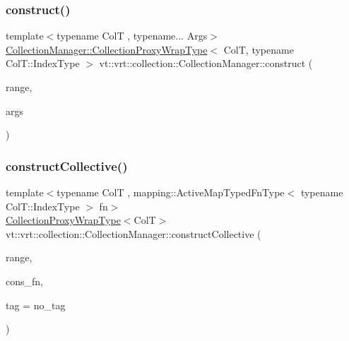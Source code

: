 \mbox{\label{structvt_1_1vrt_1_1collection_1_1_collection_manager_a9049432725068d7ec7f664f7a8759a69}} 
\subsubsection{\texorpdfstring{construct()}{construct()}\hspace{0.1cm}{\footnotesize\ttfamily [2/2]}}
{\footnotesize\ttfamily template$<$typename ColT , typename... Args$>$ \\
\hyperlink{structvt_1_1vrt_1_1collection_1_1_collection_manager_a56458ed7f9bb22b631b9b3a745f42f94}{Collection\+Manager\+::\+Collection\+Proxy\+Wrap\+Type}$<$ ColT, typename Col\+T\+::\+Index\+Type $>$ vt\+::vrt\+::collection\+::\+Collection\+Manager\+::construct (\begin{DoxyParamCaption}\item[{typename Col\+T\+::\+Index\+Type}]{range,  }\item[{Args \&\&...}]{args }\end{DoxyParamCaption})}

\mbox{\label{structvt_1_1vrt_1_1collection_1_1_collection_manager_a619d6e576f0d108e442b16ca4f68f1f3}} 
\subsubsection{\texorpdfstring{construct\+Collective()}{constructCollective()}\hspace{0.1cm}{\footnotesize\ttfamily [1/3]}}
{\footnotesize\ttfamily template$<$typename ColT , mapping\+::\+Active\+Map\+Typed\+Fn\+Type$<$ typename Col\+T\+::\+Index\+Type $>$ fn$>$ \\
\hyperlink{structvt_1_1vrt_1_1collection_1_1_collection_manager_a56458ed7f9bb22b631b9b3a745f42f94}{Collection\+Proxy\+Wrap\+Type}$<$ColT$>$ vt\+::vrt\+::collection\+::\+Collection\+Manager\+::construct\+Collective (\begin{DoxyParamCaption}\item[{typename Col\+T\+::\+Index\+Type}]{range,  }\item[{\hyperlink{structvt_1_1vrt_1_1collection_1_1_collection_manager_a7503830bc133013d542856fa39834dcc}{Distrib\+Construct\+Fn}$<$ ColT $>$}]{cons\+\_\+fn,  }\item[{\hyperlink{namespacevt_a84ab281dae04a52a4b243d6bf62d0e52}{Tag\+Type} const \&}]{tag = {\ttfamily no\+\_\+tag} }\end{DoxyParamCaption})}

